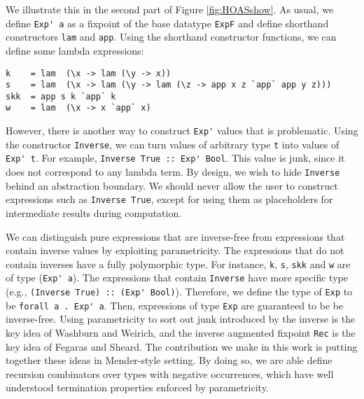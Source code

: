 We illustrate this in the second part of Figure \ref{fig:HOASshow}.
As usual, we define \verb|Exp' a| as a fixpoint of the base datatype \verb|ExpF|
and define shorthand constructors \verb|lam| and \verb|app|.
Using the shorthand constructor functions,
we can define some lambda expressions: %
\begin{verbatim}
k    = lam  (\x -> lam (\y -> x))
s    = lam  (\x -> lam (\y -> lam (\z -> app x z `app` app y z)))
skk  = app s k `app` k
w    = lam  (\x -> x `app` x)
\end{verbatim}
However, there is another way to construct \verb|Exp'| values that is
problematic. Using the constructor \verb|Inverse|, we can turn values of
arbitrary type \verb|t| into values of \verb|Exp' t|.  For example, 
\verb|Inverse True :: Exp' Bool|. This value is junk, since it does 
not correspond to any lambda term. By design, we wish to hide \verb|Inverse|
behind an abstraction boundary. We should never allow the user to construct
expressions such as \verb|Inverse True|, except for using them as placeholders
for intermediate results during computation.


We can distinguish pure expressions that are inverse-free
from expressions that contain inverse values by exploiting parametricity.
The expressions that do not contain inverses have a fully polymorphic type.
For instance, \verb|k|, \verb|s|, \verb|skk| and \verb|w| are of type (\verb|Exp' a|).
The expressions that contain \verb|Inverse| have more specific type
(e.g., \verb|(Inverse True) :: (Exp' Bool)|).
Therefore, we define the type of \verb|Exp| to be \verb|forall a . Exp' a|.
Then, expressions of type \verb|Exp| are guaranteed to be be inverse-free.
Using parametricity to sort out junk introduced by the inverse is the key idea
of Washburn and Weirich\cite{bgb}, and the inverse augmented fixpoint
\verb|Rec| is the key idea of Fegaras and Sheard\cite{FegShe96}.
The contribution we make in this work is putting together these ideas
in Mender-style setting.  By doing so, we are able define recursion combinators
over types with negative occurrences, which have well understood
termination properties enforced by parametricity.

